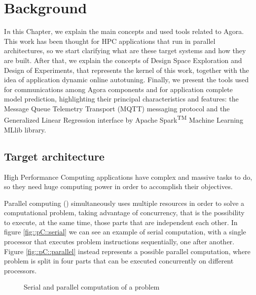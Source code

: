 \chapter{Background}\label{back}

\lettrine{I}{}\textit{n} this Chapter, we explain the main concepts and used tools related to Agora. This work has been thought for HPC applications that run in parallel architectures, so we start clarifying what are these target systems and how they are built. After that, we explain the concepts of Design Space Exploration and Design of Experiments, that represents the kernel of this work, together with the idea of application dynamic online autotuning. Finally, we present the tools used for communications among Agora components and for application complete model prediction, highlighting their principal characteristics and features: the Message Queue Telemetry Transport (MQTT) messaging protocol and the Generalized Linear Regression interface by Apache Spark\textsuperscript{TM} Machine Learning MLlib library.


\section{Target architecture}

High Performance Computing applications have complex and massive tasks to do, so they need huge computing power in order to accomplish their objectives.

Parallel computing (\cite{barney2012introduction}) simultaneously uses multiple re\-sourc\-es in order to solve a computational problem, taking advantage of concurrency, that is the possibility to execute, at the same time, those parts that are independent each other. In figure \ref{fig::pC::serial} we can see an example of serial computation, with a single processor that executes problem instructions sequentially, one after another. Figure \ref{fig::pC::parallel} instead represents a possible parallel computation, where problem is split in four parts that can be executed concurrently on different processors.

\begin{figure}[htb]

    \centering

    \enskip
    
    \caption{Serial and parallel computation of a problem}

\end{figure}

